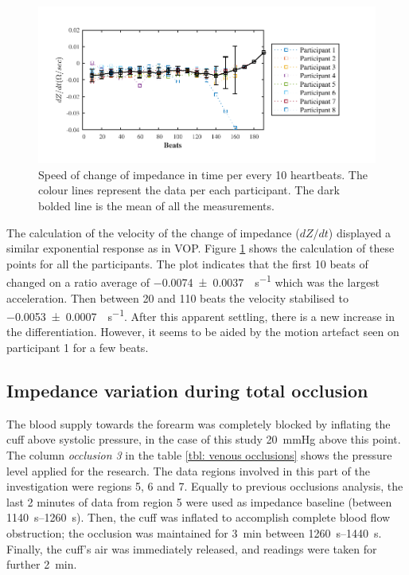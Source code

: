 \begin{figure}[!b]
	\centering
	\includegraphics[width=15cm,keepaspectratio]{figure_vop_6}    
	\caption[Rate of change of impedance per 10 heartbeats during partial arterial occlusion]{Speed of change of impedance in time per every 10 heartbeats. The colour lines represent the data per each participant. The dark bolded line is the mean of all the measurements.}
	\label{fig:arterial occlusion change}
\end{figure}  

The calculation of the velocity of the change of impedance  ($dZ/dt$) displayed a similar exponential response as in VOP. Figure \ref{fig:arterial occlusion change} shows the calculation of these points for all the participants. The plot indicates that the first 10 beats of changed on a ratio average of \SI{-0.0074(00037)}{\Omega\per\second} which was the largest acceleration. Then between 20 and 110 beats the velocity stabilised to \SI{-0.0053(00007)}{\Omega\per\second}. After this apparent settling, there is a new increase in the differentiation. However, it seems to be aided by the motion artefact seen on participant 1 for a few beats. 




\subsection{Impedance variation during total occlusion}
\label{section occlusion 1.3}
The blood supply towards the forearm was completely blocked by inflating the cuff above systolic pressure, in the case of this study \SI{20}{\mmHg} above this point. The column \textit{occlusion 3} in the table \ref{tbl: venous occlusions} shows the pressure level applied for the research. The data regions involved in this part of the investigation were regions 5, 6 and 7. Equally to previous occlusions analysis, the last 2 minutes of data from region 5 were used as impedance baseline (between \SIrange{1140}{1260}{\second}). Then, the cuff was inflated to accomplish complete blood flow obstruction; the occlusion was maintained for \SI{3}{\minute} between \SIrange{1260}{1440}{\second}. Finally, the cuff's air was immediately released, and readings were taken for further \SI{2}{\minute}.

